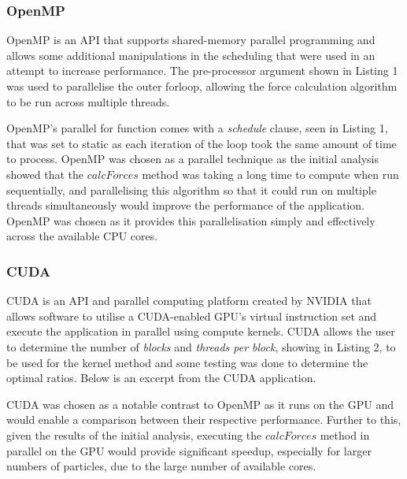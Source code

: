 \documentclass[12pt,journal,transmag]{IEEEtran}
\begin{document}
	\subsubsection{OpenMP}
	OpenMP is an API that supports shared-memory parallel programming and allows some additional manipulations in the scheduling that were used in an attempt to increase performance. The pre-processor argument shown in Listing 1 was used to parallelise the outer forloop, allowing the force calculation algorithm to be run across multiple threads.
	
	
	
	OpenMP's parallel for function comes with a \textit{schedule} clause, seen in Listing 1, that was set to static as each iteration of the loop took the same amount of time to process. OpenMP was chosen as a parallel technique as the initial analysis showed that the $calcForces$ method was taking a long time to compute when run sequentially, and parallelising this algorithm so that it could run on multiple threads simultaneously would improve the performance of the application. OpenMP was chosen as it provides this parallelisation simply and effectively across the available CPU cores.
	
	\subsubsection{CUDA}
	CUDA is an API and parallel computing platform created by NVIDIA that allows software to utilise a CUDA-enabled GPU's virtual instruction set and execute the application in parallel using compute kernels. CUDA allows the user to determine the number of \textit{blocks} and \textit{threads per block}, showing in Listing 2, to be used for the kernel method and some testing was done to determine the optimal ratios. Below is an excerpt from the CUDA application.
	
	
	
	CUDA was chosen as a notable contrast to OpenMP as it runs on the GPU and would enable a comparison between their respective performance. Further to this, given the results of the initial analysis, executing the $calcForces$ method in parallel on the GPU would provide significant speedup, especially for larger numbers of particles, due to the large number of available cores.
	
\end{document}
